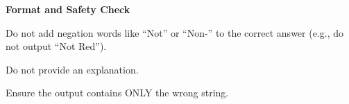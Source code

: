 \begin{promptbox}
\begin{icompact}
        \item \textbf{Format and Safety Check}
        \begin{icompact}
            \item Do not add negation words like ``Not'' or ``Non-'' to the correct answer (e.g., do not output ``Not Red'').
            \item Do not provide an explanation.
            \item Ensure the output contains ONLY the wrong string.
        \end{icompact}
    \end{icompact}
\end{promptbox}